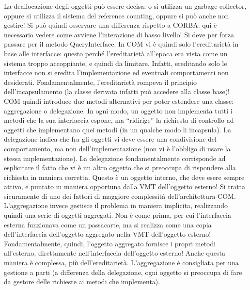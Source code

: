 La deallocazione degli oggetti può essere decisa: o si utilizza un garbage collector, oppure si utilizza il sistema del
reference counting, oppure si può anche non gestire! Si può quindi osservare una differenza rispetto a CORBA: qui è
necessario vedere come avviene l'interazione di basso livello! Si deve per forza passare per il metodo QueryInterface.
In COM vi è quindi solo l'ereditarietà in base alle interfacce: questo perché l'ereditarietà all'epoca era vista come un
sistema troppo accoppiante, e quindi da limitare. Infatti, ereditando solo le interfacce non si eredita
l'implementazione ed eventuali comportamenti non desiderati. Fondamentalmente, l'ereditarietà rompeva il principio
dell'incapsulamento (la classe derivata infatti può accedere alla classe base)!
COM quindi introduce due metodi alternativi per poter estendere una classe: aggregazione o delegazione. In ogni modo, un
oggetto non implementa tutti i metodi che la sua interfaccia espone, ma ``ridirige'' la richiesta di controllo ad
oggetti che implementano quei metodi (in un qualche modo li incapsula).
La delegazione indica che fra gli oggetti vi deve essere una condivisione del comportamento, ma non dell'implementazione
(non vi è l'obbligo di usare la stessa implementazione). La delegazione fondamentalmente corrisponde ad esplicitare il
fatto che vi è un altro oggetto che si preoccupa di rispondere alla richiesta in maniera corretta. Questo è un oggetto
interno, che deve esere sempre attivo, e puntato in maniera opportuna dalla VMT dell'oggetto esterno!
Si tratta sicuramente di uno dei fattori di maggiore complessità dell'architettura COM.
L'aggregazione invece gestisce il problema in maniera implicita, realizzando quindi una serie di oggetti aggregati. Non
è come prima, per cui l'interfaccia esterna funzionava come un passacarte, ma si realizza come una copia
dell'interfaccia dell'oggetto aggregato nella VMT dell'oggetto esterno! Fondamentalmente, quindi, l'oggetto aggregato
fornisce i propri metodi all'esterno, direttamente nell'interfaccia dell'oggetto esterno! Anche questa maniera è
complessa, più dell'ereditarietà. L'aggregazione è consigliata per una gestione a parti (a differenza della delegazione,
ogni oggetto si preoccupa di fare da gestore delle richieste ai metodi che implementa).
